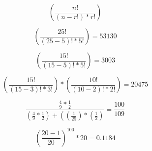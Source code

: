\documentclass[10pt]{book}
\begin{document}
\begin{mdSnippets}
\newcommand{\jacobi}[2]{\ensuremath{\left(\frac{#1}{#2}\right)}}

\begin{mdDisplaySnippet}[b2e69358e3ba43056385378b8301dded]%
\[%
\left(\frac {n!}  {(n-r!) * r!} \right)
\]%
\end{mdDisplaySnippet}%
\begin{mdDisplaySnippet}[65614c494414df0e37d1248688f6f599]%
\[%
\left(\frac {25!} {(25-5)! * 5!} \right) = 53130
\]%
\end{mdDisplaySnippet}%
\begin{mdDisplaySnippet}[dd18ca832c6e24f2eb5c3cc44d230bfe]%
\[%
\left(\frac {15!} {(15-5)! * 5!} \right) = 3003
\]%
\end{mdDisplaySnippet}%
\begin{mdDisplaySnippet}[ac48d040498964f6ff1c7ca631070388]%
\[%
\left(\frac {15!} {(15-3)! * 3!} \right) * \left(\frac {10!} {(10-2)! * 2!} \right) = 20475 
\]%
\end{mdDisplaySnippet}%
\begin{mdDisplaySnippet}[2926e4a75530e8d242e92f6c54701ed1]%
\[%
{\frac {{\frac {4} {9}} * {\frac {1} {2}}} {\left({\frac {4} {9}} * {\frac {1} {2}}\right) + \left(\left({\frac {1} {25}}\right) * \left({\frac {1} {2}}\right)}}  = {\frac {100} {109}}
\]%
\end{mdDisplaySnippet}%
\begin{mdDisplaySnippet}[a5764fc97eb99f70e2764a86ae74bf28]%
\[%
\left({\frac {20-1} {20}}\right) ^ {100} * 20 = 0.1184
\]%
\end{mdDisplaySnippet}%

\end{mdSnippets}
\end{document}
